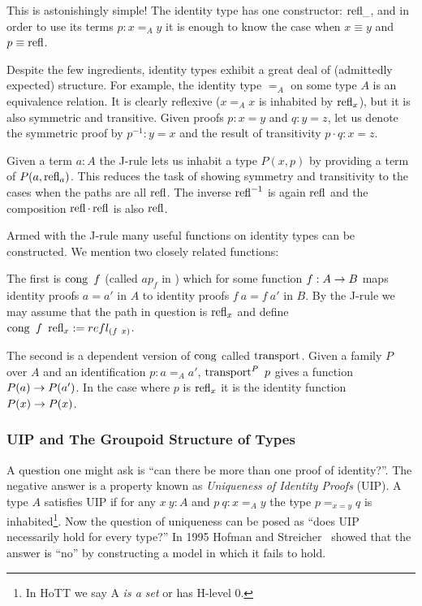 This is astonishingly simple! The identity type has one constructor: $\operatorname{refl}_{\_}$,
and in order to use its terms $p : x =_A y$ it is enough to know the case when $x
\equiv y$ and $p \equiv \operatorname{refl}$.

Despite the few ingredients, identity types exhibit a great deal of (admittedly
expected) structure. For example, the identity type $=_A$ on some type $A$ is an
equivalence relation. It is clearly reflexive ($x =_A x$ is inhabited by
$\operatorname{refl}_x$), but it is also symmetric and transitive. Given proofs $p : x = y$
and $q : y = z$, let us denote the symmetric proof by $p^{-1} : y = x$ and the
result of transitivity $p \cdot q : x = z$.

Given a term $a:A$ the J-rule lets us inhabit a type $P(x,p)$ by providing a
term of $P(a, \operatorname{refl}_a)$. This reduces the task of showing symmetry and
transitivity to the cases when the paths are all $\operatorname{refl}$. The inverse $\operatorname{refl}^{-1}$
is again $\operatorname{refl}$ and the composition $\operatorname{refl} \cdot \operatorname{refl}$ is also $\operatorname{refl}$.


Armed with the J-rule many useful functions on identity types can be
constructed. We mention two closely related functions:

The first is $\operatorname{cong}~f$ (called $ap_f$ in \cite{hottbook, lemma 2.2.1}) which for some
function $f : A \rightarrow B$ maps identity proofs $a = a'$ in $A$ to identity proofs
$f~a = f~a'$ in $B$. By the J-rule we may assume that the path in question is
$\operatorname{refl}_x$ and define $\operatorname{cong}~f~\operatorname{refl}_x := refl_{(f~x)}$.

The second is a dependent version of $\operatorname{cong}$ called $\operatorname{transport}$. Given a
family $P$ over $A$ and an identification $p : a =_A a'$, $\operatorname{transport}^P~p$ gives
a function $P(a) \rightarrow P(a')$. In the case where $p$ is $\operatorname{refl}_{x}$ it is the
identity function $P(x) \rightarrow P(x)$.


\subsubsection{UIP and The Groupoid Structure of Types}
A question one might ask is ``can there be more than one proof of identity?''.
The negative answer is a property known as \emph{Uniqueness of Identity Proofs} (UIP). A
type $A$ satisfies UIP if for any $x~y : A$ and $p~q : x =_A y$ the type $p =_{x
= y} q$ is inhabited\footnote{In HoTT we say A \emph{is a set} or has H-level 0.}. Now the
question of uniqueness can be posed as ``does UIP necessarily hold for every type?'' In 1995
Hofman and Streicher~\cite{Hofman1998} showed that the answer is ``no'' by
constructing a model in which it fails to hold.

